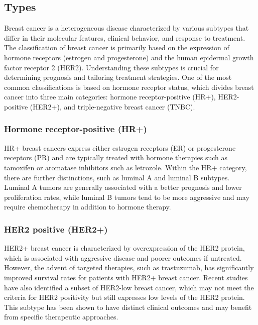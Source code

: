 \pagebreak

\subsection{Types}
\label{sec:brca_types}

Breast cancer is a heterogeneous disease characterized by various subtypes that
differ in their molecular features, clinical behavior, and response to
treatment\supercite{harbeck_breast_2019}.
The classification of breast cancer is primarily based on the expression of
hormone receptors (estrogen and progesterone) and the human epidermal growth
factor receptor 2 (HER2).
Understanding these subtypes is crucial for determining prognosis and tailoring
treatment strategies.
One of the most common classifications is based on hormone receptor status,
which divides breast cancer into three main categories: hormone
receptor-positive (HR+), HER2-positive (HER2+), and triple-negative breast
cancer (TNBC)\supercite{clusan_basic_2023}.

\subsubsection{Hormone receptor-positive (HR+)}
HR+ breast cancers express either estrogen receptors (ER) or progesterone
receptors (PR) and are typically treated with hormone therapies such as
tamoxifen or aromatase inhibitors such as
letrozole\supercite{geyer_molecular_2012}.
Within the HR+ category, there are further distinctions, such as luminal A and
luminal B subtypes.
Luminal A tumors are generally associated with a better prognosis and lower
proliferation rates, while luminal B tumors tend to be more aggressive and may
require chemotherapy in addition to hormone
therapy\supercite{geyer_molecular_2012}.

\subsubsection{HER2 positive (HER2+)}
HER2+ breast cancer is characterized by overexpression of the HER2 protein,
which is associated with aggressive disease and poorer outcomes if untreated.
However, the advent of targeted therapies, such as trastuzumab, has
significantly improved survival rates for patients with HER2+ breast
cancer\supercite{modi_antitumor_2020}.
Recent studies have also identified a subset of HER2-low breast cancer, which
may not meet the criteria for HER2 positivity but still expresses low levels of
the HER2 protein.
This subtype has been shown to have distinct clinical outcomes and may benefit
from specific therapeutic
approaches\supercite{won_clinical_2022,mutai_prognostic_2021}.

